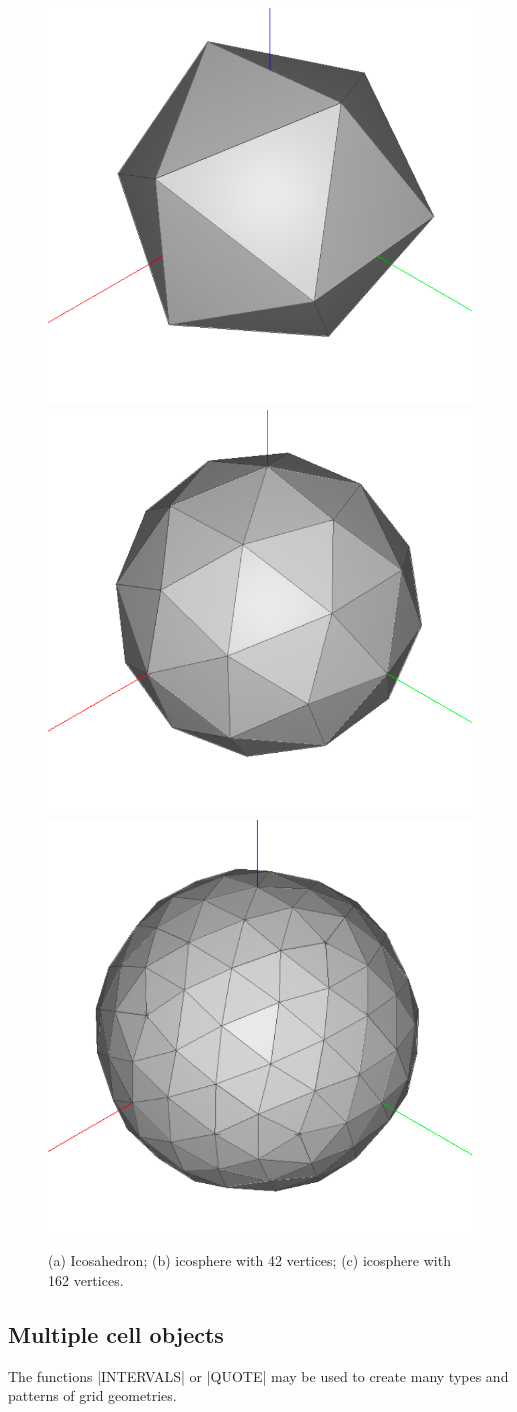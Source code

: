 \begin{figure}[htbp] %
   \includegraphics[width=0.34\linewidth]{chapter-05/figs/icosphere0}%
   \includegraphics[width=0.33\linewidth]{chapter-05/figs/icosphere1}%
   \includegraphics[width=0.325\linewidth]{chapter-05/figs/icosphere2}%
\hfill
\caption{(a) Icosahedron; (b) icosphere with 42 vertices; (c)  icosphere with 162 vertices. }
\label{5:icospheres}
\end{figure}



\subsection*{Multiple cell objects}\label{sect:5-1-1}


The functions |INTERVALS| or |QUOTE| may be used to create many types and patterns of grid geometries.

